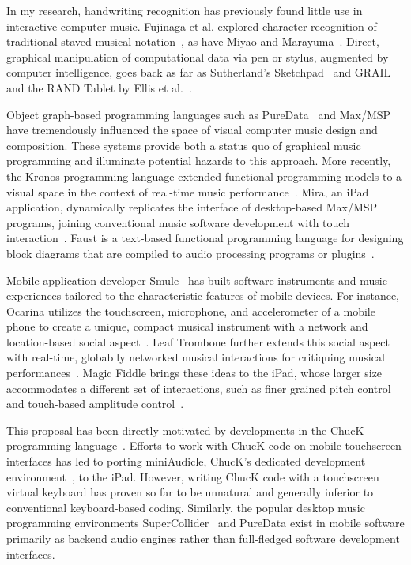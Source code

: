 \documentclass[10pt,letterpaper]{article}
\begin{document}

In my research, handwriting recognition has previously found little use in interactive computer music. 
Fujinaga et al. explored character recognition of traditional staved musical notation~\cite{fujinaga1989computer, fujinaga1996exemplar}, as have Miyao and Marayuma~\cite{miyao2007online}. 
Direct, graphical manipulation of computational data via pen or stylus, augmented by computer intelligence, goes back as far as Sutherland's Sketchpad~\cite{sutherland1964sketch} and GRAIL and the RAND Tablet by Ellis et al.~\cite{davis1964rand}. 

Object graph-based programming languages such as PureData~\cite{puckette1996pure} and Max/MSP~\cite{zicarelli1998extensible} have tremendously influenced the space of visual computer music design and composition. 
These systems provide both a status quo of graphical music programming and illuminate potential hazards to this approach. 
More recently, the Kronos programming language extended functional programming models to a visual space in the context of real-time music performance~\cite{norilo2012visualization}. 
Mira, an iPad application, dynamically replicates the interface of desktop-based Max/MSP programs, joining conventional music software development with touch interaction~\cite{tarakajian2013anmira}. 
Faust is a text-based functional programming language for designing block diagrams that are compiled to audio processing programs or plugins~\cite{orlarey2009faust}. 

Mobile application developer Smule~\cite{wang2009smule} has built software instruments and music experiences tailored to the characteristic features of mobile devices. 
For instance, Ocarina utilizes the touchscreen, microphone, and accelerometer of a mobile phone to create a unique, compact musical instrument with a network and location-based social aspect~\cite{wang2014ocarina}. 
Leaf Trombone further extends this social aspect with real-time, globablly networked musical interactions for critiquing musical performances~\cite{wang2011world}. 
Magic Fiddle brings these ideas to the iPad, whose larger size accommodates a different set of interactions, such as finer grained pitch control and touch-based amplitude control~\cite{wang2011designing}. 

This proposal has been directly motivated by developments in the ChucK programming language~\cite{wang2008chuck}. 
Efforts to work with ChucK code on mobile touchscreen interfaces has led to porting miniAudicle, ChucK's dedicated development environment~\cite{salazar2006miniaudicle}, to the iPad. 
However, writing ChucK code with a touchscreen virtual keyboard has proven so far to be unnatural and generally inferior to conventional keyboard-based coding. 
Similarly, the popular desktop music programming environments SuperCollider~\cite{mccartney2002supercollider} and PureData exist in mobile software primarily as backend audio engines rather than full-fledged software development interfaces.   
\end{document}
